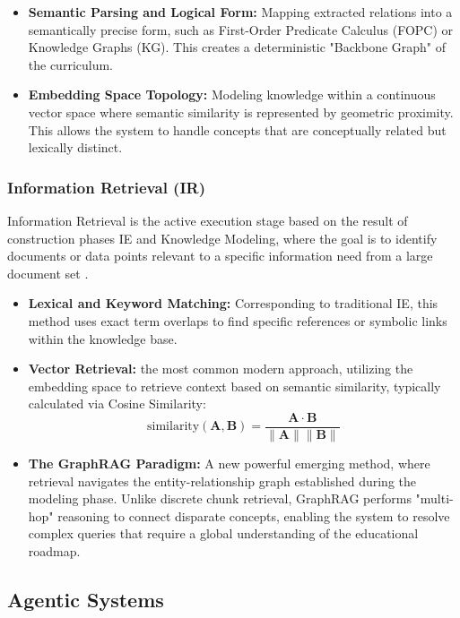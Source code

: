 \begin{itemize}
    \item \textbf{Semantic Parsing and Logical Form:} Mapping extracted relations into a semantically precise form, such as First-Order Predicate Calculus (FOPC) or Knowledge Graphs (KG). This creates a deterministic "Backbone Graph" of the curriculum.
    \item \textbf{Embedding Space Topology:} Modeling knowledge within a continuous vector space where semantic similarity is represented by geometric proximity. This allows the system to handle concepts that are conceptually related but lexically distinct.
\end{itemize}

\subsubsection{Information Retrieval (IR)}
Information Retrieval is the active execution stage based on the result of construction phases IE and Knowledge Modeling, where the goal is to identify documents or data points relevant to a specific information need from a large document set \cite{StanfordNLP}.

\begin{itemize}
    \item \textbf{Lexical and Keyword Matching:} Corresponding to traditional IE, this method uses exact term overlaps to find specific references or symbolic links within the knowledge base.
    \item \textbf{Vector Retrieval:} the most common modern approach, utilizing the embedding space to retrieve context based on semantic similarity, typically calculated via Cosine Similarity:
    \begin{equation}
        \text{similarity}(\mathbf{A}, \mathbf{B}) = \frac{\mathbf{A} \cdot \mathbf{B}}{\|\mathbf{A}\| \|\mathbf{B}\|}
    \end{equation}
    \item \textbf{The GraphRAG Paradigm:} A new powerful emerging method, where retrieval navigates the entity-relationship graph established during the modeling phase. Unlike discrete chunk retrieval, GraphRAG performs "multi-hop" reasoning to connect disparate concepts, enabling the system to resolve complex queries that require a global understanding of the educational roadmap.
\end{itemize}

\subsection{Agentic Systems}

